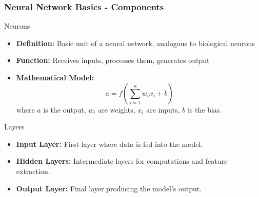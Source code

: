 \documentclass[aspectratio=169]{beamer}
\begin{document}
\begin{frame}[fragile]
    \frametitle{Neural Network Basics - Components}
    \begin{block}{Neurons}
        \begin{itemize}
            \item \textbf{Definition:} Basic unit of a neural network, analogous to biological neurons
            \item \textbf{Function:} Receives inputs, processes them, generates output
            \item \textbf{Mathematical Model:}
            \begin{equation}
                a = f\left(\sum_{i=1}^n w_i x_i + b\right)
            \end{equation}
            where \( a \) is the output, \( w_i \) are weights, \( x_i \) are inputs, \( b \) is the bias.
        \end{itemize}
    \end{block}
    
    \begin{block}{Layers}
        \begin{itemize}
            \item \textbf{Input Layer:} First layer where data is fed into the model.
            \item \textbf{Hidden Layers:} Intermediate layers for computations and feature extraction.
            \item \textbf{Output Layer:} Final layer producing the model's output.
        \end{itemize}
    \end{block}
\end{frame}
\end{document}

